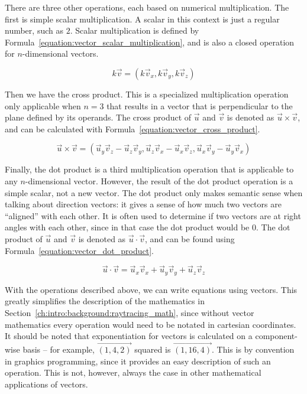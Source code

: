 There are three other operations, each based on numerical multiplication.
The first is simple scalar multiplication.
A scalar in this context is just a regular number, such as $2$.
Scalar multiplication is defined by Formula~\ref{equation:vector_scalar_multiplication}, and is also a closed operation for $n$-dimensional vectors.

\begin{equation}
  \label{equation:vector_scalar_multiplication}
  k\vec{v} = (k\vec{v}_x, k\vec{v}_y, k\vec{v}_z)
\end{equation}

Then we have the cross product.
This is a specialized multiplication operation only applicable when $n = 3$ that results in a vector that is perpendicular to the plane defined by its operands.
The cross product of $\vec{u}$ and $\vec{v}$ is denoted as $\vec{u} \times \vec{v}$, and can be calculated with Formula~\ref{equation:vector_cross_product}.

\begin{equation}
  \label{equation:vector_cross_product}
  \vec{u} \times \vec{v} = (\vec{u}_y\vec{v}_z - \vec{u}_z\vec{v}_y, \vec{u}_z\vec{v}_x - \vec{u}_x\vec{v}_z, \vec{u}_x\vec{v}_y - \vec{u}_y\vec{v}_x)
\end{equation}

Finally, the dot product is a third multiplication operation that is applicable to any $n$-dimensional vector.
However, the result of the dot product operation is a simple scalar, not a new vector.
The dot product only makes semantic sense when talking about direction vectors: it gives a sense of how much two vectors are ``aligned'' with each other.
It is often used to determine if two vectors are at right angles with each other, since in that case the dot product would be $0$.
The dot product of $\vec{u}$ and $\vec{v}$ is denoted as $\vec{u} \cdot \vec{v}$, and can be found using Formula~\ref{equation:vector_dot_product}.

\begin{equation}
  \label{equation:vector_dot_product}
  \vec{u} \cdot \vec{v} = \vec{u}_x\vec{v}_x + \vec{u}_y\vec{v}_y + \vec{u}_z\vec{v}_z
\end{equation}


With the operations described above, we can write equations using vectors.
This greatly simplifies the description of the mathematics in Section~\ref{ch:intro:background:raytracing_math}, since without vector mathematics every operation would need to be notated in cartesian coordinates.
It should be noted that exponentiation for vectors is calculated on a component-wise basis -- for example, $\vec{(1, 4, 2)}$ squared is $\vec{(1, 16, 4)}$.
This is by convention in graphics programming, since it provides an easy description of such an operation.
This is not, however, always the case in other mathematical applications of vectors.

